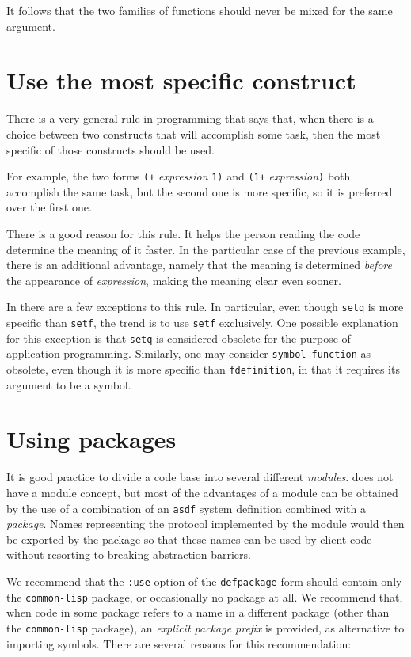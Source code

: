 It follows that the two families of functions should never be mixed
for the same argument.

\section{Use the most specific construct}

There is a very general rule in programming that says that, when there
is a choice between two constructs that will accomplish some task,
then the most specific of those constructs should be used.

For example, the two forms \texttt{(+} \textit{expression} \texttt{1)}
and \texttt{(1+} \textit{expression}\texttt{)} both accomplish the
same task, but the second one is more specific, so it is preferred over
the first one.

There is a good reason for this rule.  It helps the person reading the
code determine the meaning of it faster.  In the particular case of
the previous example, there is an additional advantage, namely that
the meaning is determined \emph{before} the appearance of
\textit{expression}, making the meaning clear even sooner.

In \commonlisp{} there are a few exceptions to this rule. In
particular, even though \texttt{setq} is more specific than
\texttt{setf}, the trend is to use \texttt{setf} exclusively.  One
possible explanation for this exception is that \texttt{setq} is
considered obsolete for the purpose of application programming.
Similarly, one may consider \texttt{symbol-function} as obsolete, even
though it is more specific than \texttt{fdefinition}, in that it
requires its argument to be a symbol.

\section{Using packages}
\label{sec-coding-style-using-packages}

It is good practice to divide a code base into several different
\emph{modules}.  \commonlisp{} does not have a module concept, but
most of the advantages of a module can be obtained by the use of a
combination of an \texttt{asdf} system definition combined with a
\commonlisp{} \emph{package}.  Names representing the protocol
implemented by the module would then be exported by the package so
that these names can be used by client code without resorting to
breaking abstraction barriers.

We recommend that the \texttt{:use} option of the \texttt{defpackage}
form should contain only the \texttt{common-lisp} package, or
occasionally no package at all.  We recommend that, when code in some
package refers to a name in a different package (other than the
\texttt{common-lisp} package), an \emph{explicit package prefix} is
provided, as alternative to importing symbols.  There are several
reasons for this recommendation:

